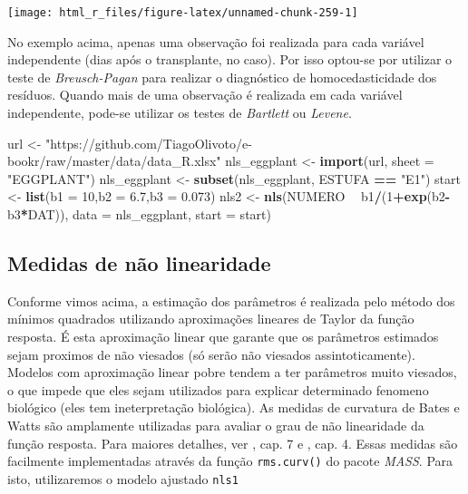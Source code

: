 \documentclass[
]{book}
\newenvironment{Shaded}{\begin{snugshade}}{\end{snugshade}}
\newcommand{\DataTypeTok}[1]{\textcolor[rgb]{0.13,0.29,0.53}{#1}}
\newcommand{\DecValTok}[1]{\textcolor[rgb]{0.00,0.00,0.81}{#1}}
\newcommand{\FloatTok}[1]{\textcolor[rgb]{0.00,0.00,0.81}{#1}}
\newcommand{\KeywordTok}[1]{\textcolor[rgb]{0.13,0.29,0.53}{\textbf{#1}}}
\newcommand{\NormalTok}[1]{#1}
\newcommand{\OperatorTok}[1]{\textcolor[rgb]{0.81,0.36,0.00}{\textbf{#1}}}
\newcommand{\StringTok}[1]{\textcolor[rgb]{0.31,0.60,0.02}{#1}}
\begin{document}
\begin{center}\texttt{[image: html\_r\_files/figure-latex/unnamed-chunk-259-1]} \end{center}

No exemplo acima, apenas uma observação foi realizada para cada variável independente (dias após o transplante, no caso). Por isso optou-se por utilizar o teste de \emph{Breusch-Pagan} para realizar o diagnóstico de homocedasticidade dos resíduos. Quando mais de uma observação é realizada em cada variável independente, pode-se utilizar os testes de \emph{Bartlett} ou \emph{Levene}.

\begin{Shaded}
\begin{Highlighting}[]
\NormalTok{url <-}\StringTok{ "https://github.com/TiagoOlivoto/e-bookr/raw/master/data/data_R.xlsx"}
\NormalTok{nls_eggplant <-}\StringTok{ }\KeywordTok{import}\NormalTok{(url, }\DataTypeTok{sheet =} \StringTok{"EGGPLANT"}\NormalTok{)}
\NormalTok{nls_eggplant <-}\StringTok{ }\KeywordTok{subset}\NormalTok{(nls_eggplant, ESTUFA  }\OperatorTok{==}\StringTok{  "E1"}\NormalTok{) }
\NormalTok{start <-}\StringTok{ }\KeywordTok{list}\NormalTok{(}\DataTypeTok{b1 =} \DecValTok{10}\NormalTok{,}\DataTypeTok{b2 =} \FloatTok{6.7}\NormalTok{,}\DataTypeTok{b3 =} \FloatTok{0.073}\NormalTok{)}
\NormalTok{nls2 <-}\StringTok{ }\KeywordTok{nls}\NormalTok{(NUMERO }\OperatorTok{~}\StringTok{ }\NormalTok{b1}\OperatorTok{/}\NormalTok{(}\DecValTok{1}\OperatorTok{+}\KeywordTok{exp}\NormalTok{(b2}\OperatorTok{-}\NormalTok{b3}\OperatorTok{*}\NormalTok{DAT)), }
            \DataTypeTok{data =}\NormalTok{ nls_eggplant,}
            \DataTypeTok{start =}\NormalTok{ start)}
\end{Highlighting}
\end{Shaded}

\hypertarget{medidas-de-nuxe3o-linearidade}{%
\subsection{Medidas de não linearidade}\label{medidas-de-nuxe3o-linearidade}}

Conforme vimos acima, a estimação dos parâmetros é realizada pelo método dos mínimos quadrados  utilizando aproximações lineares de Taylor da função resposta. É esta aproximação linear que garante que os parâmetros estimados sejam proximos de não viesados (só serão não viesados assintoticamente). Modelos com aproximação linear pobre tendem a ter parâmetros muito viesados, o que impede que eles sejam utilizados para explicar determinado fenomeno biológico (eles tem ineterpretação biológica). As medidas de curvatura de Bates e Watts são amplamente utilizadas para avaliar o grau de não linearidade da função resposta. Para maiores detalhes, ver \citet{Bates1988}, cap. 7 e \citet{Seber2003}, cap. 4. Essas medidas são facilmente implementadas através da função \texttt{rms.curv()}  do pacote \emph{MASS}. Para isto, utilizaremos o modelo ajustado \texttt{nls1}
\end{document}
